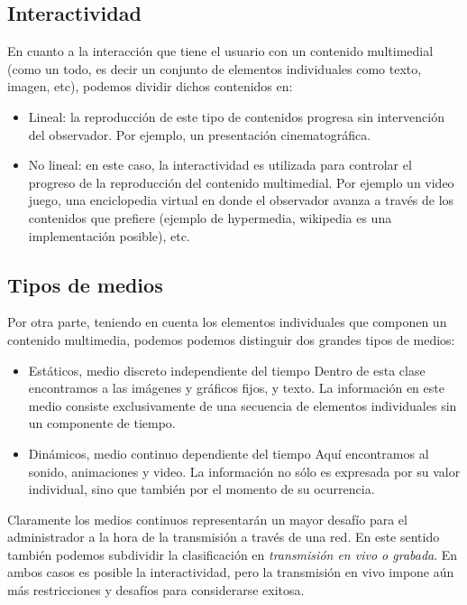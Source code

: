 \documentclass[12pt]{article}
\begin{document}
\subsection*{Interactividad}
En cuanto a la interacción que tiene el usuario con un contenido 
multimedial (como un todo, es decir un conjunto de elementos individuales
como texto, imagen, etc), podemos dividir dichos contenidos en: 
\begin{itemize}
\item Lineal: la reproducción de este tipo de contenidos progresa 
sin intervención del observador. Por ejemplo, un presentación cinematográfica.  
\item No lineal: en este caso, la interactividad es utilizada para 
controlar el progreso de la reproducción del contenido multimedial. Por 
ejemplo un video juego, una enciclopedia virtual en donde el observador
avanza a través de los contenidos que prefiere (ejemplo de hypermedia, 
wikipedia es una implementación posible), etc. 
\end{itemize}

\subsection*{Tipos de medios}
Por otra parte, teniendo en cuenta los elementos individuales que componen un 
contenido multimedia, podemos podemos distinguir dos grandes tipos de medios: 

\begin{itemize}
\item{Estáticos, medio discreto independiente del tiempo}
Dentro de esta clase encontramos a las imágenes y gráficos fijos, y texto. La información 
en este medio consiste exclusivamente de una secuencia de elementos individuales 
sin un componente de tiempo.
\item{Dinámicos, medio continuo dependiente del tiempo}
Aquí encontramos al sonido, animaciones y video. La información no sólo es 
expresada por su valor individual, sino que también por el momento 
de su ocurrencia.
\end{itemize}

Claramente los medios continuos representarán un mayor desafío para el 
administrador a la hora de la transmisión a través de una red. En este 
sentido también podemos subdividir la clasificación en {\it transmisión
en vivo o grabada}. En ambos casos es posible la interactividad, pero 
la transmisión en vivo impone aún más restricciones y desafíos para 
considerarse exitosa. 
\end{document}
